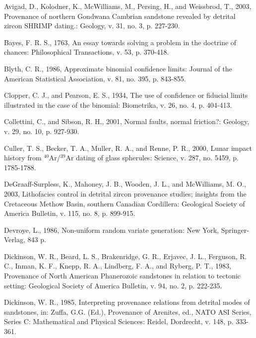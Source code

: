 \documentclass{article}
\begin{document}
\begin{description}

\item  Avigad, D.,  Kolodner,  K., McWilliams,  M.,  Persing, H.,  and
Weissbrod,  T.,   2003,  Provenance  of   northern  Gondwana  Cambrian
sandstone revealed by detrital  zircon SHRIMP dating.: Geology, v. 31,
no. 3, p. 227-230.

\item Bayes, F. R. S., 1763, An essay towards solving a problem in the
doctrine of chances: Philosophical Transactions, v. 53, p. 370-418.

\item  Blyth, C.  R.,  1986, Approximate  binomial confidence  limits:
Journal  of the  American  Statistical Association,  v.  81, no.  395,
p. 843-855.

\item Clopper, C. J., and Pearson,  E. S., 1934, The use of confidence
or  fiducial   limits  illustrated  in  the  case   of  the  binomial:
Biometrika, v. 26, no. 4, p. 404-413.

\item Collettini, C.,  and Sibson, R. H., 2001,  Normal faults, normal
friction?: Geology, v. 29, no. 10, p. 927-930.

\item Culler, T.  S., Becker, T.  A., Muller, R. A., and Renne, P. R.,
2000, Lunar  impact history  from $^{40}$Ar/$^{39}$Ar dating  of glass
spherules: Science, v. 287, no. 5459, p. 1785-1788.

\item  DeGraaff-Surpless,  K., Mahoney,  J.  B.,  Wooden,  J. L.,  and
McWilliams,  M.  O.,  2003,  Lithofacies control  in  detrital  zircon
provenance  studies;  insights   from  the  Cretaceous  Methow  Basin,
southern Canadian Cordillera:  Geological Society of America Bulletin,
v. 115, no. 8, p. 899-915.

\item Devroye, L., 1986, Non-uniform random variate generation: New York, 
Springer-Verlag, 843 p.

\item Dickinson,  W. R.,  Beard, L. S.,  Brakenridge, G.  R., Erjavec,
J. L., Ferguson,  R. C., Inman, K. F., Knepp, R.  A., Lindberg, F. A.,
and  Ryberg, P.  T., 1983,  Provenance of  North  American Phanerozoic
sandstones  in relation  to  tectonic setting:  Geological Society  of
America Bulletin, v. 94, no. 2, p. 222-235.

\item Dickinson,  W. R., 1985, Interpreting  provenance relations from
detrital  modes of sandstones,  in: Zuffa,  G.G. (Ed.),  Provenance of
Arenites, ed.,  NATO ASI Series,  Series C: Mathematical  and Physical
Sciences: Reidel, Dordrecht, v. 148, p. 333-361.


\end{description}
\end{document}
